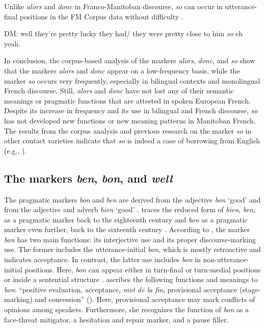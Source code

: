 \documentclass[output=paper]{langscibook}
\begin{document}
\noindent
Unlike \textit{alors} and \textit{donc} in Franco-Manitoban discourse, \textit{so} can occur in utterance-final positions in the FM Corpus data without difficulty .

\begin{exe}
    \ex\label{hennecke:ex:33} DM: well they’re pretty lucky they had/ they were pretty close to him \textit{so} eh yeah.
\end{exe}


In conclusion, the corpus-based analysis of the markers \textit{alors}, \textit{donc}, and \textit{so} show that the markers \textit{alors} and \textit{donc} appear on a low-frequency basis, while the marker \textit{so} occurs very frequently, especially in bilingual contexts and monolingual French discourse. Still, \textit{alors} and \textit{donc} have not lost any of their semantic meanings or pragmatic functions that are attested in spoken European French. Despite its increase in frequency and its use in bilingual and French discourse, \textit{so} has not developed new functions or new meaning patterns in Manitoban French. The results from the corpus analysis and previous research on the marker \textit{so} in other contact varieties indicate that \textit{so} is indeed a case of borrowing from English (e.g., \citealt{Mougeon.1991,Torres.2008}).

\subsection{The markers \textit{ben}, \textit{bon}, and \textit{well}}\label{hennecke:sec:3.3}
The pragmatic markers \textit{bon} and \textit{ben} are derived from the adjective \textit{bon} ‘good’ and from the adjective and adverb \textit{bien} ‘good’ \citep[222]{MosegaardHansen.1998}. \citet[91]{Waltereit.2007} traces the reduced form of \textit{bien}, \textit{ben}, as a pragmatic marker back to the eighteenth century and \textit{bon} as a pragmatic marker even further, back to the sixteenth century \citep[92]{Waltereit.2007}. According to \citet[225]{MosegaardHansen.1998}, the marker \textit{bon} has two main functions: its interjective use and its proper discourse-marking use. The former includes the utterance-initial \textit{bon}, which is mostly retroactive and indicates acceptance. In contrast, the latter use includes \textit{bon} in non-utterance-initial positions. Here, \textit{bon} can appear either in turn-final or turn-medial positions or inside a sentential structure \citep[234]{MosegaardHansen.1998}. \citeauthor{Beeching.2011} ascribes the following functions and meanings to \textit{bon}: “positive evaluation, acceptance, \textit{mot de la fin}, provisional acceptance (stage-marking) and concession” (\citeyear[102]{Beeching.2011}). Here, provisional acceptance may mark conflicts of opinions among speakers. Furthermore, she recognizes the function of \textit{bon} as a face-threat mitigator, a hesitation and repair marker, and a pause filler. 
\end{document}
